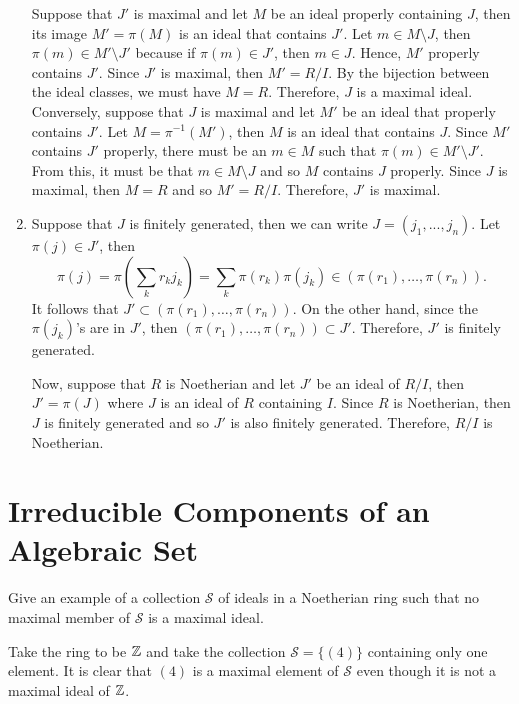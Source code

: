 \begin{solution}
\begin{enumerate}[label=(\alph*)]
        Suppose that $J'$ is maximal and let $M$ be an ideal properly containing $J$, then its image $M' = \pi(M)$ is an ideal that contains $J'$. Let $m \in M \setminus J$, then $\pi(m) \in M'\setminus J'$ because if $\pi(m) \in J'$, then $m \in J$. Hence, $M'$ properly contains $J'$. Since $J'$ is maximal, then $M' = R/I$. By the bijection between the ideal classes, we must have $M = R$. Therefore, $J$ is a maximal ideal. Conversely, suppose that $J$ is maximal and let $M'$ be an ideal that properly contains $J'$. Let $M = \pi^{-1}(M')$, then $M$ is an ideal that contains $J$. Since $M'$ contains $J'$ properly, there must be an $m \in M$ such that $\pi(m) \in M' \setminus J'$. From this, it must be that $m \in M\setminus J$ and so $M$ contains $J$ properly. Since $J$ is maximal, then $M = R$ and so $M' = R/I$. Therefore, $J'$ is maximal.
        \item Suppose that $J$ is finitely generated, then we can write $J = (j_1, ..., j_n)$. Let $\pi(j) \in J'$, then
        $$\pi(j) = \pi\left(\sum_kr_kj_k\right) = \sum_k \pi(r_k)\pi(j_k) \in (\pi(r_1), \dots, \pi(r_n)).$$
        It follows that $J' \subset (\pi(r_1), \dots, \pi(r_n))$. On the other hand, since the $\pi(j_k)$'s are in $J'$, then $(\pi(r_1), \dots, \pi(r_n)) \subset J'$. Therefore, $J'$ is finitely generated.

        Now, suppose that $R$ is Noetherian and let $J'$ be an ideal of $R/I$, then $J' = \pi(J)$ where $J$ is an ideal of $R$ containing $I$. Since $R$ is Noetherian, then $J$ is finitely generated and so $J'$ is also finitely generated. Therefore, $R/I$ is Noetherian.
    \end{enumerate}
\end{solution}

\section{Irreducible Components of an Algebraic Set}

\begin{exercise}
    Give an example of a collection $\mathscr{S}$ of ideals in a Noetherian ring such that no maximal member of $\mathscr{S}$ is a maximal ideal. \\
\end{exercise}

\begin{solution}
    Take the ring to be $\mathbb{Z}$ and take the collection $\mathscr{S} = \{(4)\}$ containing only one element. It is clear that $(4)$ is a maximal element of $\mathscr{S}$ even though it is not a maximal ideal of $\mathbb{Z}$. \\
\end{solution}

